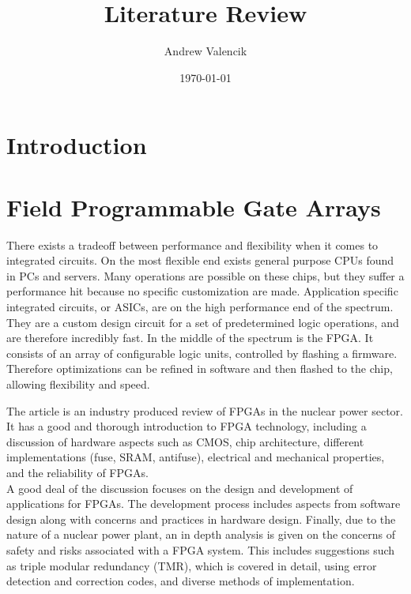 \documentclass[12pt]{article}
\begin{document}
\title{Literature Review}

\author{Andrew Valencik}

\date{\today}

\maketitle


\begin{doublespacing}

\section{Introduction}


\section{Field Programmable Gate Arrays} 
There exists a tradeoff between performance and flexibility when it comes to integrated circuits.
On the most flexible end exists general purpose CPUs found in PCs and servers.
Many operations are possible on these chips, but they suffer a performance hit because no specific customization are made.
Application specific integrated circuits, or ASICs, are on the high performance end of the spectrum.
They are a custom design circuit for a set of predetermined logic operations, and are therefore incredibly fast.
In the middle of the spectrum is the FPGA.
It consists of an array of configurable logic units, controlled by flashing a firmware.
Therefore optimizations can be refined in software and then flashed to the chip, allowing flexibility and speed.

{\large\textbf{\cite{currentState}}}
The article is an industry produced review of FPGAs in the nuclear power sector.
It has a good and thorough introduction to FPGA technology, including a discussion of hardware aspects such as CMOS, chip architecture, different implementations (fuse, SRAM, antifuse), electrical and mechanical properties, and the reliability of FPGAs.
\\

A good deal of the discussion focuses on the design and development of applications for FPGAs.
The development process includes aspects from software design along with concerns and practices in hardware design.
Finally, due to the nature of a nuclear power plant, an in depth analysis is given on the concerns of safety and risks associated with a FPGA system.
This includes suggestions such as triple modular redundancy (TMR), which is covered in detail, using error detection and correction codes, and diverse methods of implementation.


\end{doublespacing}
\end{document}

